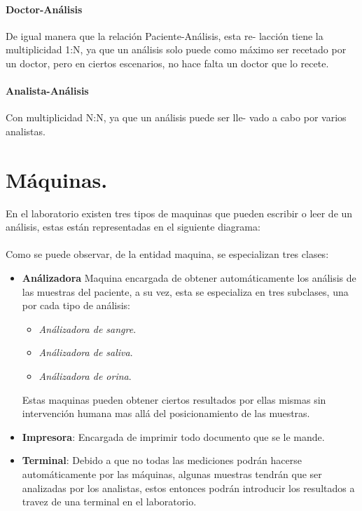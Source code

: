 \documentclass[a4paper,10pt]{article}
\begin{document}
\paragraph{Doctor-Análisis}
De igual manera que la relación Paciente-Análisis, esta re-
lacción tiene la multiplicidad 1:N, ya que un análisis solo puede como máximo
ser recetado por un doctor, pero en ciertos escenarios, no hace falta un doctor
que lo recete.

\paragraph{Analista-Análisis}
 Con multiplicidad N:N, ya que un análisis puede ser lle-
vado a cabo por varios analistas.

\section{Máquinas.}
En el laboratorio existen tres tipos de maquinas que pueden escribir o leer de un análisis, estas están representadas en el siguiente diagrama:
\paragraph{}
Como se puede observar, de la entidad maquina, se especializan tres clases:
\begin{itemize}
	\item {\bf Análizadora} Maquina encargada de obtener automáticamente los análisis de las muestras del paciente, a su vez, esta se especializa en tres subclases, una por cada tipo de análisis:
	\begin{itemize}
		\item {\it Análizadora de sangre}.
		\item {\it Análizadora de saliva}.
		\item {\it Análizadora de orina}.
	\end{itemize}
	Estas maquinas pueden obtener ciertos resultados por ellas mismas sin intervención humana mas allá del posicionamiento de las muestras.
	\item {\bf Impresora}: Encargada de imprimir todo documento que se le mande.
	\item {\bf Terminal}: Debido a que no todas las mediciones podrán hacerse automáticamente por las máquinas, algunas muestras tendrán que ser analizadas por los analistas, estos entonces podrán introducir los resultados a travez de una terminal en el laboratorio.
\end{itemize}
\end{document}
